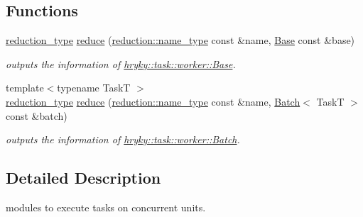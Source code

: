 \subsection*{Functions}
\begin{DoxyCompactItemize}
\item 
\hypertarget{namespacehryky_1_1task_1_1worker_a69f40c48f750e5d2a8b867f295119dac}{\hyperlink{namespacehryky_a343a9a4c36a586be5c2693156200eadc}{reduction\-\_\-type} \hyperlink{namespacehryky_1_1task_1_1worker_a69f40c48f750e5d2a8b867f295119dac}{reduce} (\hyperlink{namespacehryky_1_1reduction_ac686c30a4c8d196bbd0f05629a6b921f}{reduction\-::name\-\_\-type} const \&name, \hyperlink{classhryky_1_1task_1_1worker_1_1_base}{Base} const \&base)}\label{namespacehryky_1_1task_1_1worker_a69f40c48f750e5d2a8b867f295119dac}

\begin{DoxyCompactList}\small\item\em outputs the information of \hyperlink{classhryky_1_1task_1_1worker_1_1_base}{hryky\-::task\-::worker\-::\-Base}. \end{DoxyCompactList}\item 
\hypertarget{group__task_ga7bfbcc99f638cedafbdc6174770c4da1}{{\footnotesize template$<$typename Task\-T $>$ }\\\hyperlink{namespacehryky_a343a9a4c36a586be5c2693156200eadc}{reduction\-\_\-type} \hyperlink{group__task_ga7bfbcc99f638cedafbdc6174770c4da1}{reduce} (\hyperlink{namespacehryky_1_1reduction_ac686c30a4c8d196bbd0f05629a6b921f}{reduction\-::name\-\_\-type} const \&name, \hyperlink{classhryky_1_1task_1_1worker_1_1_batch}{Batch}$<$ Task\-T $>$ const \&batch)}\label{group__task_ga7bfbcc99f638cedafbdc6174770c4da1}

\begin{DoxyCompactList}\small\item\em outputs the information of \hyperlink{classhryky_1_1task_1_1worker_1_1_batch}{hryky\-::task\-::worker\-::\-Batch}. \end{DoxyCompactList}\end{DoxyCompactItemize}


\subsection{Detailed Description}
modules to execute tasks on concurrent units. 